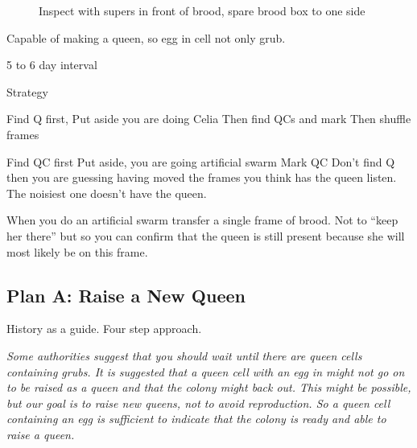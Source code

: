 \begin{figure}[H]
\centering
{}
\caption{Inspect with supers in front of brood, spare brood box to one side}%
\end{figure}

Capable of making a queen, so egg in cell not only grub.

5 to 6 day interval

Strategy

Find Q first,
Put aside you are doing Celia
Then find QCs and mark
Then shuffle frames

Find QC first
Put aside, you are going artificial swarm
Mark QC
Don’t find Q then you are guessing having moved the frames you think has the queen listen.
The noisiest one doesn't have the queen.
 
When you do an artificial swarm transfer a single frame of brood.  
Not to “keep her there” but so you can confirm that the queen is still present because she will most likely be on this frame.



\subsection{Plan A: Raise a New Queen}

History as a guide.
Four step approach.

\textit{Some authorities suggest that you should wait until 
there are queen cells containing grubs.
It is suggested that a queen cell with an egg in might not 
go on to be raised as a queen and that the colony might back out.
This might be possible, but our goal is to raise new queens,
not to avoid reproduction.
So a queen cell containing an egg is sufficient to indicate
that the colony is ready and able to raise a queen.}

